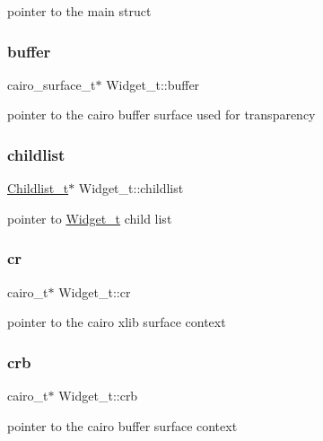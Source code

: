 pointer to the main struct \mbox{\label{structWidget__t_a84d225e7b261d67daa764b47c8c62107}} 
\subsubsection{\texorpdfstring{buffer}{buffer}}
{\footnotesize\ttfamily cairo\+\_\+surface\+\_\+t$\ast$ Widget\+\_\+t\+::buffer}

pointer to the cairo buffer surface used for transparency \mbox{\label{structWidget__t_ac203ccbc58958a7c205897d4aba197e9}} 
\subsubsection{\texorpdfstring{childlist}{childlist}}
{\footnotesize\ttfamily \hyperlink{structChildlist__t}{Childlist\+\_\+t}$\ast$ Widget\+\_\+t\+::childlist}

pointer to \hyperlink{structWidget__t}{Widget\+\_\+t} child list \mbox{\label{structWidget__t_a26594f6ffabe98fc08f9207150fc9417}} 
\subsubsection{\texorpdfstring{cr}{cr}}
{\footnotesize\ttfamily cairo\+\_\+t$\ast$ Widget\+\_\+t\+::cr}

pointer to the cairo xlib surface context \mbox{\label{structWidget__t_ad98022ee160d4c0906110868fc9e5664}} 
\subsubsection{\texorpdfstring{crb}{crb}}
{\footnotesize\ttfamily cairo\+\_\+t$\ast$ Widget\+\_\+t\+::crb}

pointer to the cairo buffer surface context \mbox{\label{structWidget__t_a9dd7b58be77bf31ab021aa627a73186a}} 
